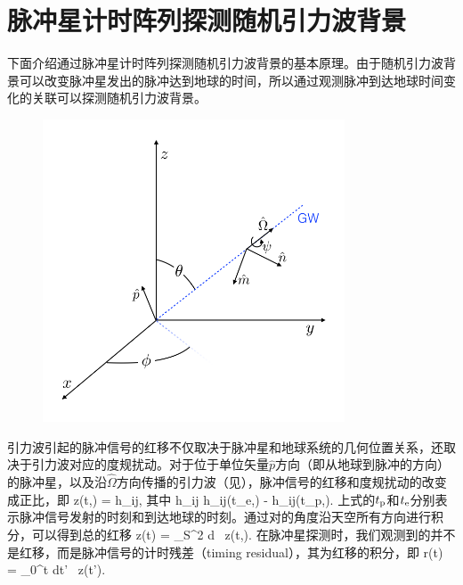 \section{脉冲星计时阵列探测随机引力波背景}
下面介绍通过脉冲星计时阵列探测随机引力波背景的基本原理。由于随机引力波背景可以改变脉冲星发出的脉冲达到地球的时间，所以通过观测脉冲到达地球时间变化的关联可以探测随机引力波背景。
\begin{figure}[htb!]
    \centering
    \includegraphics[width=0.8\textwidth]{Img/pulsar_position_diagram_square}
    \label{position_diagram}
\end{figure}

引力波引起的脉冲信号的红移不仅取决于脉冲星和地球系统的几何位置关系，还取决于引力波对应的度规扰动\cite{Detweiler:1979wn}。对于位于单位矢量$\hat{p}$方向（即从地球到脉冲的方向）的脉冲星，以及沿$\hat{\Omega}$方向传播的引力波（见），脉冲信号的红移和度规扰动的改变成正比，即\cite{Detweiler:1979wn}
%
\beq
z(t,\hat{\Omega}) = 
\Delta h_{ij},
\label{tdredshift}
\eeq
其中
\beq
\Delta h_{ij}
\equiv
h_{ij}(t_{\rm e},\hat{\Omega}) - 
h_{ij}(t_{\rm p},\hat{\Omega}).
\label{delhdef}
\eeq 
上式的$t_{\rm p}$和$t_{\rm e}$分别表示脉冲信号发射的时刻和到达地球的时刻。通过对的角度沿天空所有方向进行积分，可以得到总的红移
\beq
z(t) = \int_{S^2} d\hat{\Omega} \, z(t,\hat{\Omega}).
\label{zftot}
\eeq
在脉冲星探测时，我们观测到的并不是红移，而是脉冲信号的计时残差（timing residual），其为红移的积分，即
\beq
r(t) = \int_0^{t} dt' \, z(t').
\label{residual}
\eeq

